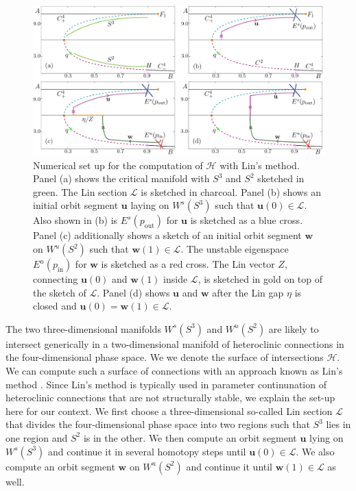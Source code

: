 \documentclass{ws-ijbc}
\begin{document}
\begin{figure}[h]
\centering
\includegraphics[]{./figures/MKMO_8.pdf}
\caption{Numerical set up for the computation of $\mathscr{H}$ with Lin's method.  Panel (a) shows the critical manifold with $S^3$ and $S^2$ sketched in green.  The Lin section $\mathscr{L}$ is sketched in charcoal.  Panel (b) shows an initial orbit segment $\mathbf{u}$ laying on $W^s(S^3)$ such that $\mathbf{u}(0) \in \mathscr{L}$.  Also shown in (b) is $E^s(p_{\text{out}})$ for $\mathbf{u}$ is sketched as a blue cross.  Panel (c) additionally shows a sketch of an initial orbit segment $\mathbf{w}$ on $W^u(S^2)$ such that $\mathbf{w}(1) \in \mathscr{L}$.  The unstable eigenspace $E^u(p_{\text{in}})$ for $\mathbf{w}$ is sketched as a red cross.  The Lin vector $Z$, connecting $\mathbf{u}(0)$ and $\mathbf{w}(1)$ inside $\mathscr{L}$, is sketched in gold on top of the sketch of $\mathscr{L}$.  Panel (d) shows $\mathbf{u}$ and $\mathbf{w}$ after the Lin gap $\eta$ is closed and $\mathbf{u}(0)=\mathbf{w}(1) \in \mathscr{L}$.}
\end{figure}


The two three-dimensional manifolds $W^s(S^3)$ and $W^u(S^2)$ are likely to intersect generically in a two-dimensional manifold of heteroclinic connections in the four-dimensional phase space.  We we denote the surface of intersections $\mathscr{H}$.  We can compute such a surface of connections with an approach known as Lin's method \cite{Lin_original, Lin_POs, Lin_POs2}.  Since Lin's method is typically used in parameter continunation of heteroclinic connections that are not structurally stable, we explain the set-up here for our context.  We first choose a three-dimensional so-called Lin section $\mathscr{L}$ that divides the four-dimensional phase space into two regions such that $S^3$ lies in one region and $S^2$ is in the other.  We then compute an orbit segment $\mathbf{u}$ lying on $W^s(S^3)$ and continue it in several homotopy steps until $\mathbf{u}(0) \in \mathscr{L}$.  We also compute an orbit segment $\mathbf{w}$ on $W^u(S^2)$ and continue it until  $\mathbf{w}(1) \in \mathscr{L}$ as well.
\end{document}
